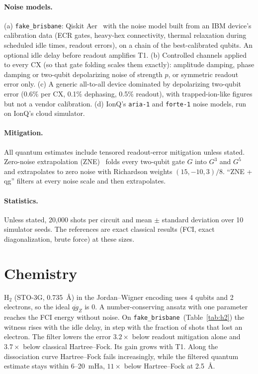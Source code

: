 \documentclass[11pt]{article}
\newcommand{\mqg}{\overline{qg}_Z}
\newcommand{\fb}{\texttt{fake\_brisbane}}
\begin{document}
\paragraph{Noise models.} (a) \fb: Qiskit Aer~\cite{javadiabhari2024qiskit} with the noise model built
from an IBM device's calibration data (ECR gates, heavy-hex connectivity, thermal relaxation during
scheduled idle times, readout errors), on a chain of the best-calibrated qubits. An optional idle
delay before readout amplifies T1. (b) Controlled channels applied to every CX (so that gate
folding scales them exactly): amplitude damping, phase damping or two-qubit depolarizing noise of
strength $p$, or symmetric readout error only. (c) A generic all-to-all device dominated by
depolarizing two-qubit error (0.6\% per CX, 0.1\% dephasing, 0.5\% readout), with trapped-ion-like
figures but not a vendor calibration. (d) IonQ's \texttt{aria-1} and \texttt{forte-1} noise models,
run on IonQ's cloud simulator.

\paragraph{Mitigation.} All quantum estimates include tensored readout-error mitigation unless
stated. Zero-noise extrapolation (ZNE)~\cite{temme2017,li2017} folds every two-qubit gate $G$ into
$G^3$ and $G^5$ and extrapolates to zero noise with Richardson weights $(15,-10,3)/8$. ``ZNE + qg''
filters at every noise scale and then extrapolates.

\paragraph{Statistics.} Unless stated, 20{,}000 shots per circuit and mean $\pm$ standard deviation
over 10 simulator seeds. The references are exact classical results (FCI, exact diagonalization,
brute force) at these sizes.

\section{Chemistry}\label{sec:chem}

H$_2$ (STO-3G, 0.735~\AA) in the Jordan--Wigner encoding uses 4 qubits and 2 electrons, so the
ideal $\mqg$ is 0. A number-conserving ansatz with one parameter reaches the FCI energy without
noise. On \fb\ (Table~\ref{tab:h2}) the witness rises with the idle delay, in step with the
fraction of shots that lost an electron. The filter lowers the error $3.2\times$ below readout
mitigation alone and $3.7\times$ below classical Hartree--Fock. Its gain grows with T1. Along the
dissociation curve Hartree--Fock fails increasingly, while the filtered quantum estimate stays
within 6--20~mHa, $11\times$ below Hartree--Fock at 2.5~\AA.
\end{document}
